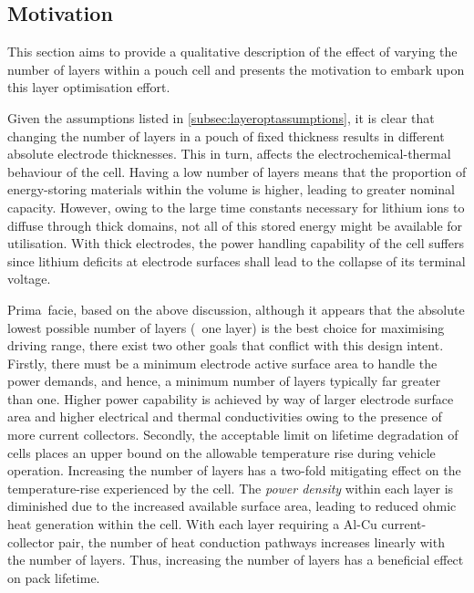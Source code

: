\subsection{Motivation}\label{subsec:layeroptmotivation}

This section aims to provide a  qualitative description of the effect of varying
the number of layers  within a pouch cell and presents  the motivation to embark
upon this layer optimisation effort.

Given the  assumptions listed in \cref{subsec:layeroptassumptions},  it is clear
that  changing the  number  of layers  in  a pouch  of  fixed thickness  results
in  different  absolute  electrode  thicknesses.   This  in  turn,  affects  the
electrochemical-thermal behaviour  of the  cell. Having a  low number  of layers
means  that the  proportion of  energy-storing  materials within  the volume  is
higher, leading  to greater nominal capacity.  However, owing to the  large time
constants necessary for  lithium ions to diffuse through thick  domains, not all
of this stored energy might be available for utilisation. With thick electrodes,
the power  handling capability  of the  cell suffers  since lithium  deficits at
electrode surfaces shall lead to the collapse of its terminal voltage.

Prima~facie,  based  on the  above  discussion,  although  it appears  that  the
absolute lowest possible  number of layers (\ie~one layer)  is the best choice
for maximising  driving range, there  exist two  other goals that  conflict with
this design  intent. Firstly, there must  be a minimum electrode  active surface
area  to  handle the  power  demands,  and hence,  a  minimum  number of  layers
typically far  greater than one. Higher  power capability is achieved  by way of
larger electrode surface  area and higher electrical  and thermal conductivities
owing to the presence of more current collectors. Secondly, the acceptable limit
on  lifetime  degradation of  cells  places  an  upper  bound on  the  allowable
temperature rise during vehicle operation. Increasing the number of layers has a
two-fold mitigating effect on the  temperature-rise experienced by the cell. The
\emph{power  density} within  each  layer  is diminished  due  to the  increased
available  surface area,  leading to  reduced ohmic  heat generation  within the
cell. With  each layer requiring a  Al-Cu current-collector pair, the  number of
heat conduction  pathways increases  linearly with the  number of  layers. Thus,
increasing the number of layers has a beneficial effect on pack lifetime.


